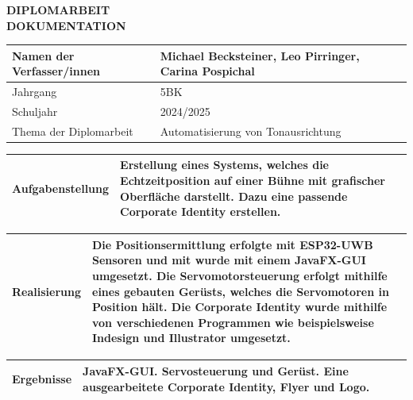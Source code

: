 \begin{center}
 \LARGE \textbf{DIPLOMARBEIT}\\
 \Large \textbf{DOKUMENTATION}\\
 \normalsize
\end{center}


\newlength{\feldC}
\newlength{\feldD}

\linespread{1.1} \normalsize
\begin{tabular}{|p{\feldC}|p{\feldD}|}
 \hline
 Namen der Verfasser/innen & Michael Becksteiner, Leo Pirringer, Carina Pospichal\\ 
 \hline 
 Jahrgang & 5BK \\ Schuljahr & 2024/2025 \\
 \hline
 Thema der Diplomarbeit & Automatisierung von Tonausrichtung\\
 \hline
\end{tabular}

\begin{tabular}{|p{\feldC}|p{\feldD}|}
 \hline
 Aufgabenstellung & Erstellung eines Systems, welches die Echtzeitposition auf einer Bühne mit grafischer Oberfläche darstellt. Dazu eine passende Corporate Identity erstellen. \\
 \hline
\end{tabular}

\begin{tabular}{|p{\feldC}|p{\feldD}|}
 \hline
 Realisierung &Die Positionsermittlung erfolgte mit ESP32-UWB Sensoren und mit wurde mit einem JavaFX-GUI umgesetzt. Die Servomotorsteuerung erfolgt mithilfe eines gebauten Gerüsts, welches die Servomotoren in Position hält. Die Corporate Identity wurde mithilfe von verschiedenen Programmen wie beispielsweise Indesign und Illustrator umgesetzt.\\
 \hline
\end{tabular}

\begin{tabular}{|p{\feldC}|p{\feldD}|}
 \hline
 Ergebnisse & JavaFX-GUI. Servosteuerung und Gerüst. Eine ausgearbeitete Corporate Identity, Flyer und Logo.\\
 \hline
\end{tabular}

